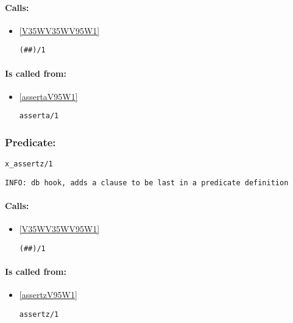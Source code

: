 \paragraph{Calls:} 
\begin{itemize}
\item \ref{V35WV35WV95W1} 
\begin{verbatim}
(##)/1
\end{verbatim}

\end{itemize}
\paragraph{Is called from:} 
\begin{itemize}
\item \ref{assertaV95W1} 
\begin{verbatim}
asserta/1
\end{verbatim}

\end{itemize}

\subsubsection{Predicate:} \label{xV95WassertzV95W1}

\begin{verbatim}
x_assertz/1
\end{verbatim}

{\small \begin{verbatim}
INFO: db hook, adds a clause to be last in a predicate definition

\end{verbatim}}
\paragraph{Calls:} 
\begin{itemize}
\item \ref{V35WV35WV95W1} 
\begin{verbatim}
(##)/1
\end{verbatim}

\end{itemize}
\paragraph{Is called from:} 
\begin{itemize}
\item \ref{assertzV95W1} 
\begin{verbatim}
assertz/1
\end{verbatim}

\end{itemize}


